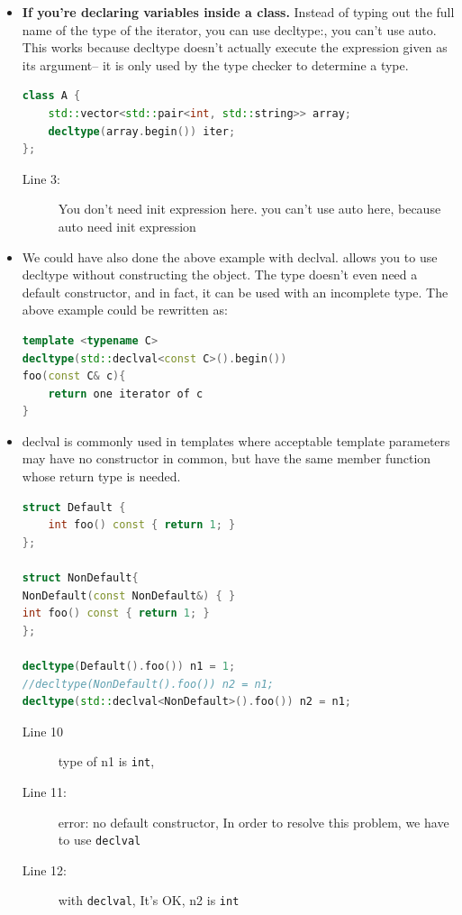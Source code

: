 \documentclass[a4paper,11pt,twoside]{book}
\begin{document}
\begin{itemize}
	\item  \textbf{If you're declaring variables inside a class.} Instead of typing out the full name of the type of the iterator, you can use decltype:, you can't use auto.  This works because decltype doesn't actually execute the expression given as its argument-- it is only used by the type checker to determine a type.
\begin{lstlisting}[frame=single, language=c++, mathescape=true]
class A {
	std::vector<std::pair<int, std::string>> array;
	decltype(array.begin()) iter; 
};
\end{lstlisting}
\begin{description}
	\item[Line 3:] You don't need init expression here. you can't use auto here, because auto need init expression
\end{description}
	
	\item We could have also done the above example with declval. allows you to use decltype without constructing the object. The type doesn't even need a default constructor, and in fact, it can be used with an incomplete type. The above example could be rewritten as:
	
\begin{lstlisting}[frame=single, language=c++, mathescape=true]
template <typename C>
decltype(std::declval<const C>().begin())
foo(const C& c){
	return one iterator of c
}
\end{lstlisting}
	
	\item declval is commonly used in templates where acceptable template parameters may have no constructor in common, but have the same member function whose return type is needed.
	
\begin{lstlisting}[frame=single, language=c++]
struct Default {
	int foo() const { return 1; } 
};

struct NonDefault{
NonDefault(const NonDefault&) { }
int foo() const { return 1; }
};
	
decltype(Default().foo()) n1 = 1;   
//decltype(NonDefault().foo()) n2 = n1;  
decltype(std::declval<NonDefault>().foo()) n2 = n1;
\end{lstlisting}
\begin{description}
	\item[Line 10 ]  type of n1 is \texttt{int}, 
	\item[Line 11:]  error: no default constructor, In order to resolve this problem, we have to use \texttt{declval}
	\item[Line 12:] with \texttt{declval}, It's OK, n2 is \texttt{int}
\end{description}
	

\end{itemize}
\end{document}
